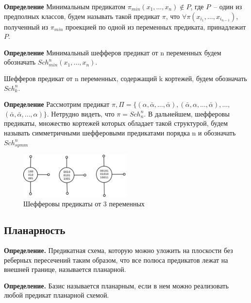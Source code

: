 \documentclass[12pt]{article}
\begin{document}
\textbf{Определение} Минимальным предикатом $\pi_{min}(x_1, \dots, x_n) \notin P$, где $P$~-- один из предполных классов, будем называть такой 
предикат $\pi$, что $\forall \pi(x_{i_1}, \dots, x_{i_{n-1}})$, полученный из $\pi_{min}$ проекцией по одной из переменных
предиката, принадлежит $P$.

\textbf{Определение} Минимальный шефферов предикат от n переменных будем обозначать $Sch_{min}^n(x_1, \dots, x_n)$.

Шефферов предикат от n переменных, содержащий k кортежей, будем обозначать $Sch_k^n$.

\textbf{Определение}
Рассмотрим предикат 
$\pi, \Pi = \{ (\alpha, \bar{\alpha}, \dots, \bar{\alpha}), (\bar{\alpha}, \alpha, \dots, \bar{\alpha}), \dots, $
$(\bar{\alpha}, \bar{\alpha}, \dots, \alpha) \}$. Нетрудно видеть, что $\pi = Sch_n^n$. В дальнейшем,
шефферовы предикаты, множество кортежей которых обладает такой структурой, будем называть 
симметричными шефферовыми предикатами порядка n и обозначать $Sch_{symm}^n$

\begin{figure}[htb]
\centering
\includegraphics[width=0.5\textwidth]{scheff3.png}
\caption{Шефферовы предикаты от 3 переменных}
\label{fig:sheff}
\end{figure}


\subsection{Планарность}
\textbf{Определение.} 
Предикатная схема, которую можно уложить на плоскости без реберных пересечений таким образом, что
все полюса предикатов лежат на внешней границе, называется планарной. 

\textbf{Определение.} Базис называется планарным, если в нем можно реализовать любой предикат планарной схемой.
\end{document}
